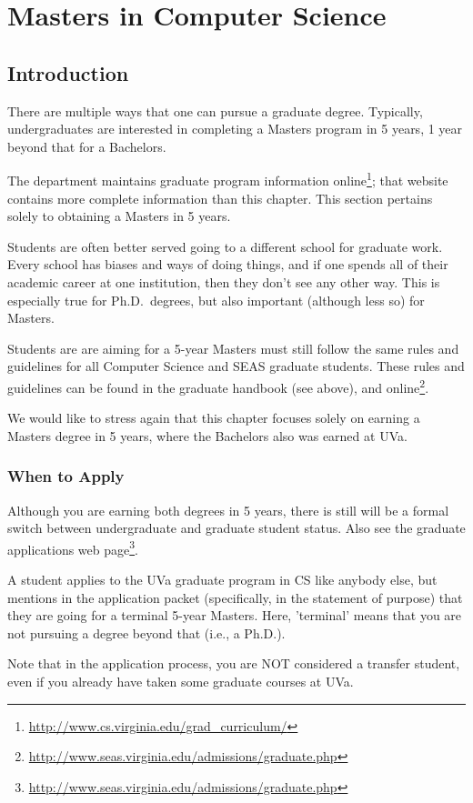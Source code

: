 \documentclass[10pt,letter]{book}
\newcommand{\mychapter}[2]{\chapter{#1}\renewcommand{\leftmark}{\textsc{#2}}}
\newcommand{\mysection}[1]{\section{#1}\renewcommand{\rightmark}{#1}}
\newcommand{\myurl}[1]{\footnote{\scriptsize\url{#1}}}
\begin{document}
\clearpage
\mychapter{Masters in Computer Science}{Masters in CS}


\mysection{Introduction}

There are multiple ways that one can pursue a graduate degree.
Typically, undergraduates are interested in completing a Masters
program in 5 years, 1 year beyond that for a Bachelors.

The department maintains graduate program information
online\myurl{http://www.cs.virginia.edu/grad_curriculum/};
that website contains more complete information than this chapter.
This section pertains solely to obtaining a Masters in 5 years.

Students are often better served going to a different school for
graduate work.  Every school has biases and ways of doing things, and
if one spends all of their academic career at one institution, then
they don't see any other way.  This is especially true for
Ph.D.\ degrees, but also important (although less so) for Masters.

Students are are aiming for a 5-year Masters must still follow the
same rules and guidelines for all Computer Science and SEAS graduate
students.  These rules and guidelines can be found in the graduate
handbook (see above), and
online\myurl{http://www.seas.virginia.edu/admissions/graduate.php}.

We would like to stress again that this chapter focuses solely on
earning a Masters degree in 5 years, where the Bachelors also was
earned at UVa.


\subsection{When to Apply}

Although you are earning both degrees in 5 years, there is still will
be a formal switch between undergraduate and graduate student status.
Also see the graduate applications web
page\myurl{http://www.seas.virginia.edu/admissions/graduate.php}.

A student applies to the UVa graduate program in CS like anybody else,
but mentions in the application packet (specifically, in the statement
of purpose) that they are going for a terminal 5-year Masters.  Here,
'terminal' means that you are not pursuing a degree beyond that (i.e.,
a Ph.D.).

Note that in the application process, you are NOT considered a
transfer student, even if you already have taken some graduate courses
at UVa.
\end{document}
